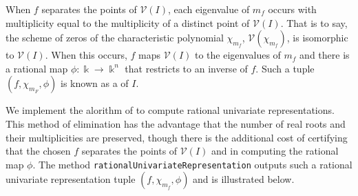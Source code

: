 %
\begin{leftbar}

\end{leftbar}
%

When $f$ separates the points of $\mathcal{V}(I)$, each eigenvalue of $m_f$ occurs with multiplicity equal to the multiplicity of a distinct point of $\mathcal{V}(I)$. That is to say, the scheme of zeros of the characteristic polynomial $\chi_{m_f}$, $\mathcal{V}(\chi_{m_f})$, is isomorphic to $\mathcal{V}(I)$. When this occurs, $f$ maps $\mathcal{V}(I)$ to the eigenvalues of $m_f$ and there is a rational map $\phi:\Bbbk\to\Bbbk^n$ that restricts to an inverse of $f$. Such a tuple $(f,\chi_{m_F},\phi)$ is known as a  of $I$.

We implement the alorithm of  to compute rational univariate representations. This method of elimination has the advantage that the number of real roots and their multiplicities are preserved, though there is the additional cost of certifying that the chosen $f$ separates the points of $\mathcal{V}(I)$ and in computing the rational map $\phi$. The method \texttt{rationalUnivariateRepresentation} outputs such a rational univariate representation tuple $(f,\chi_{m_f},\phi)$ and is illustrated below.

%
\begin{leftbar}

\end{leftbar}
%
